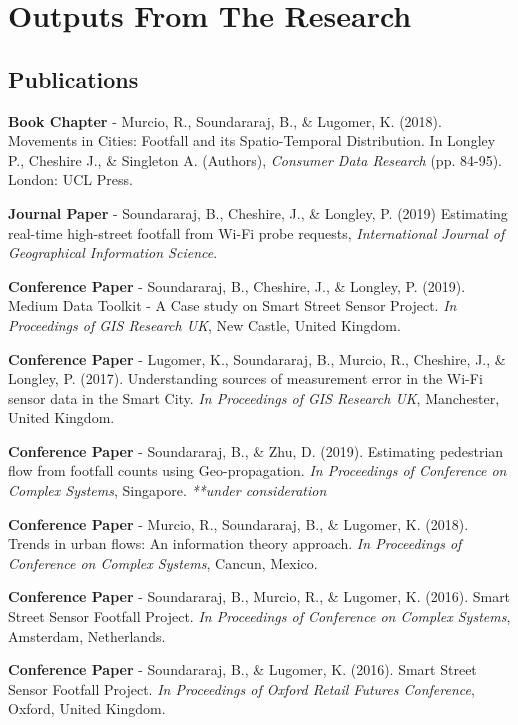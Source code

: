 
\chapter*{Outputs From The Research} \label{front:outputs}

\section*{Publications}
\textbf{Book Chapter} - Murcio, R., Soundararaj, B., \& Lugomer, K. (2018). Movements in Cities: Footfall and its Spatio-Temporal Distribution. In Longley P., Cheshire J., \& Singleton A. (Authors), \textit{Consumer Data Research} (pp. 84-95). London: UCL Press.
\vspace{0.2cm} \par \noindent \textbf{Journal Paper} - Soundararaj, B., Cheshire, J., \& Longley, P. (2019) Estimating real-time high-street footfall from Wi-Fi probe requests, \textit{International Journal of Geographical Information Science}.
\vspace{0.2cm} \par \noindent \textbf{Conference Paper} - Soundararaj, B., Cheshire, J., \& Longley, P. (2019). Medium Data Toolkit - A Case study on Smart Street Sensor Project. \textit{In Proceedings of GIS Research UK}, New Castle, United Kingdom.
\vspace{0.2cm} \par \noindent \textbf{Conference Paper} - Lugomer, K., Soundararaj, B., Murcio, R., Cheshire, J., \& Longley, P. (2017). Understanding sources of measurement error in the Wi-Fi sensor data in the Smart City. \textit{In Proceedings of GIS Research UK}, Manchester, United Kingdom.
\vspace{0.2cm} \par \noindent \textbf{Conference Paper} - Soundararaj, B., \& Zhu, D. (2019). Estimating pedestrian flow from footfall counts using Geo-propagation. \textit{In Proceedings of Conference on Complex Systems}, Singapore. \textit{**under consideration}
\vspace{0.2cm} \par \noindent \textbf{Conference Paper} - Murcio, R., Soundararaj, B., \& Lugomer, K. (2018). Trends in urban flows: An information theory approach. \textit{In Proceedings of Conference on Complex Systems}, Cancun, Mexico.
\vspace{0.2cm} \par \noindent \textbf{Conference Paper} - Soundararaj, B., Murcio, R., \& Lugomer, K. (2016). Smart Street Sensor Footfall Project. \textit{In Proceedings of Conference on Complex Systems}, Amsterdam, Netherlands.
\vspace{0.2cm} \par \noindent \textbf{Conference Paper} - Soundararaj, B., \& Lugomer, K. (2016). Smart Street Sensor Footfall Project. \textit{In Proceedings of Oxford Retail Futures Conference}, Oxford, United Kingdom.

